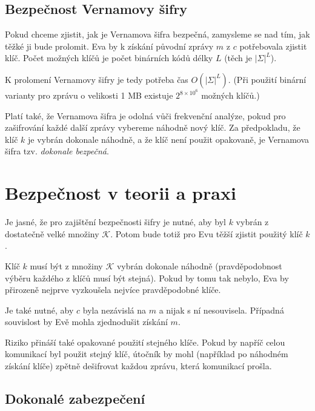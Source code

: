 \documentclass[
  program=infoi,
  biblatex,
  figures=false,
  glossaries,
  index
]{kidiplom}
\begin{document}
    \subsection{Bezpečnost Vernamovy šifry}

        Pokud chceme zjistit, jak je Vernamova šifra bezpečná, zamysleme se nad tím, jak těžké ji bude prolomit.
        Eva by k získání původní zprávy $m$ z $c$ potřebovala zjistit klíč. Počet možných klíčů je počet binárních kódů délky $L$ (těch je $|\Sigma|^L$).

        K prolomení Vernamovy šifry je tedy potřeba čas $O(|\Sigma|^L)$. (Při použití binární varianty pro zprávu o velikosti 1 MB existuje $2^{8 \times 10^6}$ možných klíčů.)
        
        Platí také, že Vernamova šifra je odolná vůči frekvenční analýze, pokud pro zašifrování každé další zprávy vybereme náhodně nový klíč.
        Za předpokladu, že klíč $k$ je vybrán dokonale náhodně, a že klíč není použit opakovaně, je Vernamova šifra tzv.
        \emph{dokonale bezpečná}.


\section{Bezpečnost v teorii a praxi}
    
    Je jasné, že pro zajištění bezpečnosti šifry je nutné, aby byl $k$ vybrán z dostatečně velké množiny $\mathcal{K}$.
    Potom bude totiž pro Evu těžší zjistit použitý klíč $k$.

    Klíč $k$ musí být z množiny $\mathcal{K}$ vybrán dokonale náhodně (pravděpodobnost výběru každého z klíčů musí být stejná).
    Pokud by tomu tak nebylo, Eva by přirozeně nejprve vyzkoušela nejvíce pravděpodobné klíče.

    Je také nutné, aby $c$ byla nezávislá na $m$ a nijak s ní nesouvisela. Případná souvislost by Evě mohla zjednodušit získání $m$.

    \begin{remark}
        Riziko přináší také opakované použití stejného klíče.
        Pokud by napříč celou komunikací byl použit stejný klíč, útočník by mohl (například po náhodném získání klíče) zpětně
        dešifrovat každou zprávu, která komunikací prošla.
    \end{remark}


    \subsection{Dokonalé zabezpečení}\label{sub:perfect-security}
\end{document}
